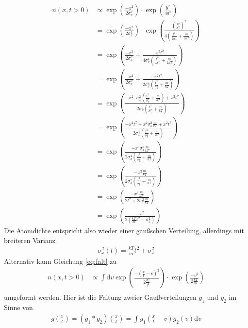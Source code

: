 \documentclass[10pt,a4paper]{extarticle}
\begin{document}
\begin{align}
n(x, t> 0) &\varpropto \exp\left(\frac{-x^2}{2 \sigma_x^2}\right) \cdot \exp \left(\frac{b^2}{4a^2}\right) \\
&= \exp\left(\frac{-x^2}{2 \sigma_x^2}\right) \cdot \exp \left(\frac{\left( \frac{xt}{\sigma_x^2}\right)^2}{4\left(\frac{t^2}{2 \sigma_x^2} + \frac{m}{2kT} \right)}\right) \\
&= \exp\left(\frac{-x^2}{2 \sigma_x^2} + \frac{x^2t^2}{4\sigma_x^4\left(\frac{t^2}{2 \sigma_x^2} + \frac{m}{2kT} \right)}\right) \\
&= \exp\left(\frac{-x^2}{2 \sigma_x^2} + \frac{x^2t^2}{2\sigma_x^4\left(\frac{t^2}{\sigma_x^2} + \frac{m}{kT} \right)}\right) \\
&= \exp\left(\frac{-x^2 \cdot \sigma_x^2\left(\frac{t^2}{\sigma_x^2} + \frac{m}{kT} \right) +x^2t^2}{2\sigma_x^4\left(\frac{t^2}{\sigma_x^2} + \frac{m}{kT} \right)}\right) \\
&= \exp\left(\frac{-x^2 t^2 -  x^2 \sigma_x^2 \frac{m}{kT} +x^2t^2}{2\sigma_x^4\left(\frac{t^2}{\sigma_x^2} + \frac{m}{kT} \right)}\right) \\
&= \exp\left(\frac{- x^2 \sigma_x^2 \frac{m}{kT}}{2\sigma_x^4\left(\frac{t^2}{\sigma_x^2} + \frac{m}{kT} \right)}\right) \\
&= \exp\left(\frac{- x^2 \frac{m}{kT}}{2\sigma_x^2\left(\frac{t^2}{\sigma_x^2} + \frac{m}{kT} \right)}\right) \\
&= \exp\left(\frac{- x^2 \frac{m}{kT}}{2t^2 +2 \sigma_x^2 \frac{m}{kT} }\right) \\
&= \exp\left(\frac{- x^2 }{2\left(\frac{kT}{m}t^2 + \sigma_x^2\right)}\right) 
\end{align}
Die Atomdichte entspricht also wieder einer gaußschen Verteilung, allerdings mit breiteren Varianz
\begin{align}
\sigma_x^2 \left(t\right) = \frac{kT}{m}t^2 + \sigma_x^2 \label{final} 
\end{align}
Alternativ kann Gleichung \eqref{eq:falt} zu 
\begin{align}
n(x, t> 0) &\varpropto \int \mathrm{d}v \exp\left(\frac{-(\frac{x}{t}-v)^2}{2 \frac{\sigma_x^2}{t^2}}\right) \cdot \exp \left(\frac{-v^2}{2\frac{kT}{m}}\right) \\
\end{align}
umgeformt werden.
Hier ist die Faltung zweier Gaußverteilungen $g_1$ und $g_2$ im Sinne von
\begin{align}
g \left(\frac{x}{t}\right) = \left(g_1 * g_2\right) \left(\frac{x}{t}\right) = \int  g_1\left(\frac{x}{t}-v\right) g_2 \left(v\right)\mathrm{d}v
\end{align}
\end{document}
